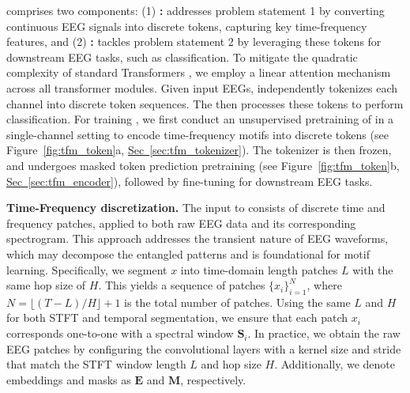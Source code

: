 
\method comprises two components: (1) \textbf{\tokenizer:} addresses problem statement 1 by converting continuous EEG signals into discrete tokens, capturing key time-frequency features, and (2) \textbf{\encoder:} tackles problem statement 2 by leveraging these tokens for downstream EEG tasks, such as classification. To mitigate the quadratic complexity of standard Transformers \cite{vaswani2017attention}, we employ a linear attention mechanism \cite{katharopoulos2020transformers, wang2020linformer} across all transformer modules.
Given input EEGs, \tokenizer independently tokenizes each channel into discrete token sequences. 
The \encoder then processes these tokens to perform classification.
For training \method, we first conduct an unsupervised pretraining of \tokenizer in a single-channel setting to encode time-frequency motifs into discrete tokens (see Figure~\ref{fig:tfm_token}a, \underline{Sec~\ref{sec:tfm_tokenizer}}). 
The tokenizer is then frozen, and \encoder undergoes masked token prediction pretraining (see Figure~\ref{fig:tfm_token}b, \underline{Sec~\ref{sec:tfm_encoder}}), followed by fine-tuning for downstream EEG tasks.





\noindent\textbf{Time-Frequency discretization. }
\label{subsec:descretization}
The input to \method consists of discrete time and frequency patches, applied to both raw EEG data and its corresponding spectrogram.
This approach addresses the transient nature of EEG waveforms, which may decompose the entangled patterns and is foundational for motif learning.
Specifically, we segment $x$ into time-domain length patches $L$ with the same hop size of $H$. This yields a sequence of patches $\{x_i\}_{i=1}^{N}$, where $N = \lfloor (T-L)/H \rfloor + 1$ is the total number of patches. 
Using the same $L$ and $H$ for both STFT and temporal segmentation, we ensure that each patch $x_i$ corresponds one-to-one with a spectral window $\mathbf{S}_i$. In practice, we obtain the raw EEG patches by configuring the convolutional layers with a kernel size and stride that match the STFT window length $L$ and hop size $H$. 
Additionally, we denote embeddings and masks as $\mathbf{E}$ and $\mathbf{M}$, respectively.


